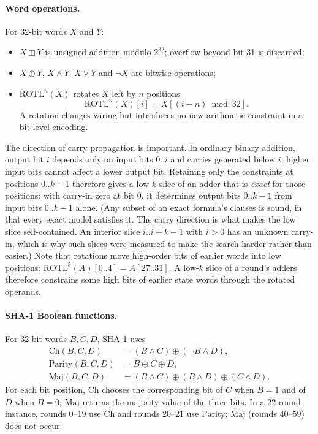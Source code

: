 \documentclass[11pt,a4paper]{article}
\newcommand{\rotl}[1]{\mathrm{ROTL}^{#1}}
\begin{document}
\paragraph{Word operations.}
For 32-bit words $X$ and $Y$:
\begin{itemize}
\item $X\boxplus Y$ is unsigned addition modulo $2^{32}$; overflow beyond bit 31 is discarded;
\item $X\oplus Y$, $X\wedge Y$, $X\vee Y$ and $\neg X$ are bitwise operations;
\item $\rotl{n}(X)$ rotates $X$ left by $n$ positions:
\[
  \rotl{n}(X)[i]=X[(i-n)\bmod 32].
\]
A rotation changes wiring but introduces no new arithmetic constraint in a bit-level encoding.
\end{itemize}
The direction of carry propagation is important. In ordinary binary addition, output bit $i$ depends
only on input bits $0..i$ and carries generated below $i$; higher input bits cannot affect a lower
output bit. Retaining only the constraints at positions $0..k-1$ therefore gives a low-$k$
slice of an adder that is \emph{exact} for those positions: with carry-in zero at bit 0, it determines
output bits $0..k-1$ from input bits $0..k-1$ alone. (Any subset of an exact formula's clauses is
sound, in that every exact model satisfies it. The carry direction is what makes the low slice
self-contained. An interior slice $i..i+k-1$ with $i>0$ has an unknown carry-in, which is why such
slices were measured to make the search harder rather than easier.) Note that rotations move
high-order bits of earlier words into low positions: $\rotl{5}(A)[0..4]=A[27..31]$. A low-$k$ slice
of a round's adders therefore constrains some high bits of earlier state words through the rotated
operands.

\paragraph{SHA-1 Boolean functions.}
For 32-bit words $B,C,D$, SHA-1 uses
\begin{align*}
\mathrm{Ch}(B,C,D) &= (B\wedge C)\oplus(\neg B\wedge D),\\
\mathrm{Parity}(B,C,D) &= B\oplus C\oplus D,\\
\mathrm{Maj}(B,C,D) &= (B\wedge C)\oplus(B\wedge D)\oplus(C\wedge D).
\end{align*}
For each bit position, $\mathrm{Ch}$ chooses the corresponding bit of $C$ when $B=1$ and of $D$
when $B=0$; $\mathrm{Maj}$ returns the majority value of the three bits. In a 22-round instance,
rounds 0--19 use $\mathrm{Ch}$ and rounds 20--21 use $\mathrm{Parity}$; $\mathrm{Maj}$ (rounds
40--59) does not occur.
\end{document}
